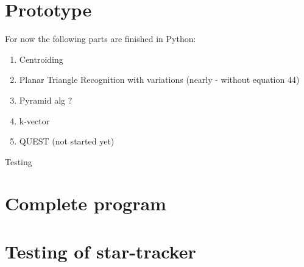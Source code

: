 \documentclass[12pt,a4paper,oneside]{article}
\begin{document}
\section{Prototype}
For now the following parts are finished in Python:
\begin{enumerate}
\item Centroiding
\item Planar Triangle Recognition with variations (nearly - without equation 44)
\item Pyramid alg ?
\item k-vector
\item QUEST (not started yet)
\end{enumerate}
Testing\par
\citet{kruijff2003star}
\newpage
\section{Complete program}

\newpage
\section{Testing of star-tracker}
\citet{RIS_0}

\newpage


%




\newpage

\listoftables

\newpage

\listoffigures

\newpage
\end{document}
